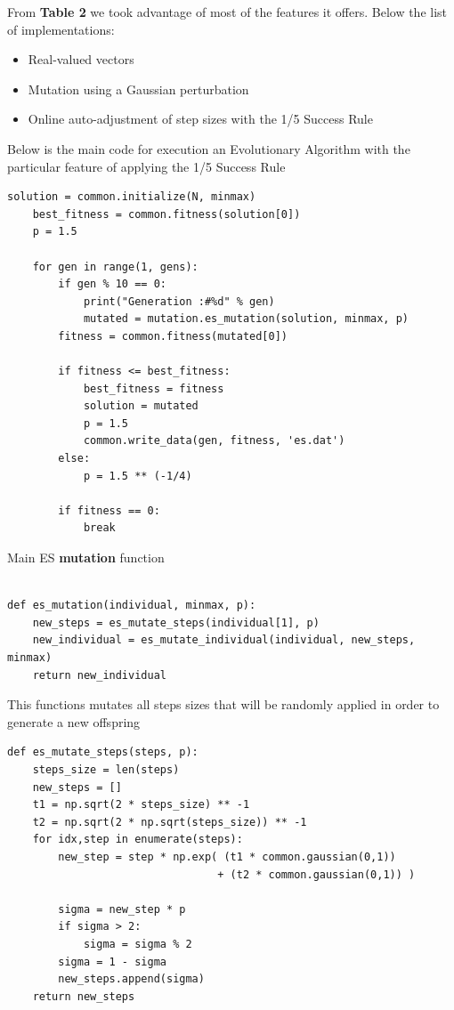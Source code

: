 \documentclass[]{spie}  %
\begin{document}
From \textbf{Table 2} we took advantage of most of the features it offers. Below the list of implementations:
\begin{itemize}
  \item Real-valued vectors
  \item Mutation using a Gaussian perturbation
  \item Online auto-adjustment of step sizes with the 1/5 Success Rule \cite{auger09}
  \end{itemize}

Below is the main code for execution an Evolutionary Algorithm with the particular feature of applying the 1/5 Success Rule \cite{auger09}
\\
\begin{lstlisting}[frame=single]  % Start your code-block 
    solution = common.initialize(N, minmax)
    best_fitness = common.fitness(solution[0])
    p = 1.5

    for gen in range(1, gens):
        if gen % 10 == 0:
            print("Generation :#%d" % gen)
	        mutated = mutation.es_mutation(solution, minmax, p)
    	fitness = common.fitness(mutated[0])

        if fitness <= best_fitness:
            best_fitness = fitness
            solution = mutated
            p = 1.5
            common.write_data(gen, fitness, 'es.dat')
        else:
            p = 1.5 ** (-1/4)

        if fitness == 0:
            break
\end{lstlisting}
Main ES \textbf{mutation} function
\\
\begin{lstlisting}[frame=single]  % Start your code-block 

def es_mutation(individual, minmax, p):
    new_steps = es_mutate_steps(individual[1], p)
    new_individual = es_mutate_individual(individual, new_steps, minmax)
    return new_individual

\end{lstlisting}

This functions mutates all steps sizes that will be randomly applied in order to generate a new offspring
\begin{lstlisting}[frame=single]  % Start your code-block 
def es_mutate_steps(steps, p):
    steps_size = len(steps)
    new_steps = []
    t1 = np.sqrt(2 * steps_size) ** -1
    t2 = np.sqrt(2 * np.sqrt(steps_size)) ** -1
    for idx,step in enumerate(steps):
        new_step = step * np.exp( (t1 * common.gaussian(0,1))
                                 + (t2 * common.gaussian(0,1)) )

        sigma = new_step * p
        if sigma > 2:
            sigma = sigma % 2
        sigma = 1 - sigma
        new_steps.append(sigma)
    return new_steps
    
\end{lstlisting}
\end{document}

